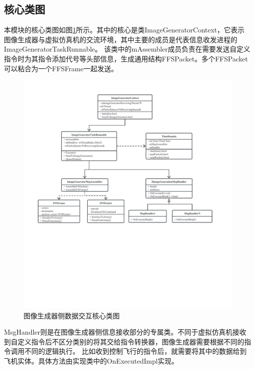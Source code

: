\subsection{核心类图}
本模块的核心类图如图\ref{module32}所示。其中的核心是类ImageGeneratorContext，它表示图像生成器与虚拟仿真机的交流环境，其中主要的成员是代表信息收发进程的ImageGeneratorTaskRunnable。
该类中的mAssembler成员负责在需要发送自定义指令时为其指令添加代号等头部信息，生成通用结构FFSPacket。多个FFSPacket可以粘合为一个FFSFrame一起发送。
\begin{figure}[h!]
    \begin{center}
        \includegraphics[width=\textwidth]{pictures/classdiagram3.pdf}
        \caption{图像生成器侧数据交互核心类图}
        \label{module32}
    \end{center}
\end{figure}
\par
MsgHandler则是在图像生成器侧信息接收部分的专属类。不同于虚拟仿真机接收到自定义指令后不区分类别的将其交给指令转换器，图像生成器需要根据不同的指令调用不同的逻辑执行。
比如收到控制飞行的指令后，就需要将其中的数据给到飞机实体。具体方法由实现类中的OnExecutedImpl实现。

